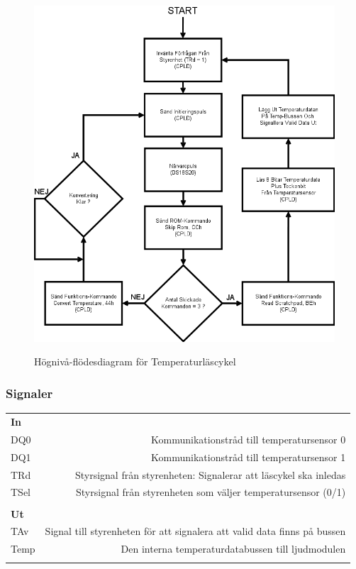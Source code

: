 \documentclass[a4paper,11pt]{article}
\begin{document}
		\begin{figure}[ht!tb]
		  \centering
		      \includegraphics[scale=0.5, angle=0]{ReadCycleFlowChart.png}
			\label{fig:RCFlowChart}
		  	\caption{Högnivå-flödesdiagram för Temperaturläscykel}
		\end{figure}

	\subsubsection{Signaler}

		\begin{tabular}{l r}
			\\{\bf In} &  \\
			DQ0 & Kommunikationstråd till temperatursensor 0\\
			DQ1 & Kommunikationstråd till temperatursensor 1\\
			TRd & Styrsignal från styrenheten: Signalerar att läscykel ska inledas\\
			TSel & Styrsignal från styrenheten som väljer temperatursensor (0/1)\\\\
			{\bf Ut} &  \\
			TAv & Signal till styrenheten för att signalera att valid data finns på bussen\\
			Temp & Den interna temperaturdatabussen till ljudmodulen\\\\
		\end{tabular}
\end{document}
